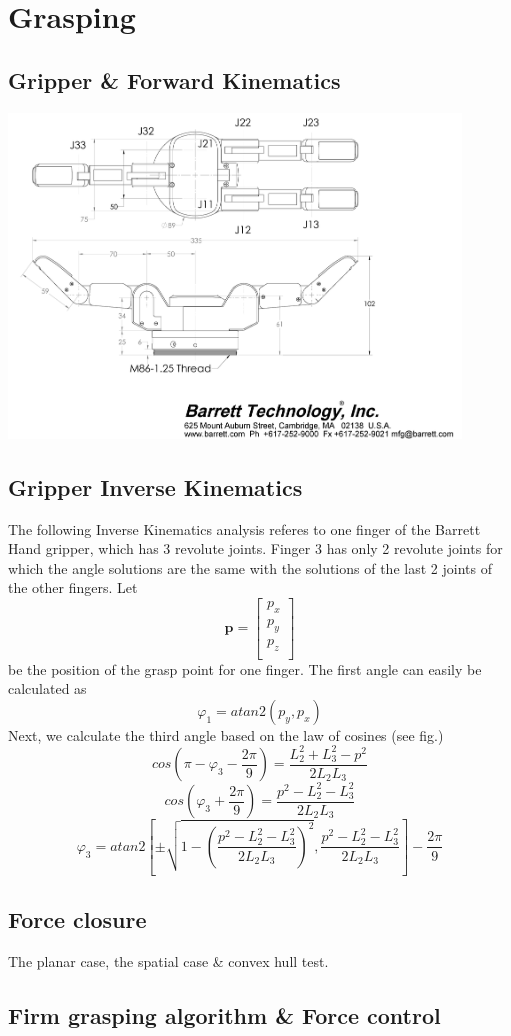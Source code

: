 \section{Grasping}

\subsection{Gripper \& Forward Kinematics}

\begin{center}
\includegraphics[width=12cm]{images/bh8-282-dimensions.png}\\[1cm]
\end{center}

\subsection{Gripper Inverse Kinematics}

The following Inverse Kinematics analysis referes to one finger of the Barrett Hand gripper, which has 3 revolute joints. Finger 3 has only 2 
revolute joints for which the angle solutions are the same with the solutions of the last 2 joints of the other fingers. Let
\[
\mathbf{p} = \begin{bmatrix} p_x \\ p_y \\ p_z \\ \end{bmatrix}
\]
be the position of the grasp point for one finger. The first angle can easily be calculated as
\[
φ_1 = atan2 \left( p_y, p_x \right)
\]
Next, we calculate the third angle based on the law of cosines (see fig.)
\[
cos \left( π - φ_3 - \frac{2π}{9} \right) = \frac{L_2^2 + L_3^2 - p^2}{2 L_2 L_3}
\]
\[
cos \left(φ_3 + \frac{2π}{9} \right) = \frac{p^2 - L_2^2 - L_3^2}{2 L_2 L_3}
\]
\[
φ_3 = atan2 \left[ \pm \sqrt{1 - \left( \frac{p^2 - L_2^2 - L_3^2}{2 L_2 L_3} \right)^2} , \frac{p^2 - L_2^2 - L_3^2}{2 L_2 L_3} \right] - \frac{2π}{9}
\]

\subsection{Force closure}
The planar case, the spatial case \& convex hull test.

\subsection{Firm grasping algorithm \& Force control}